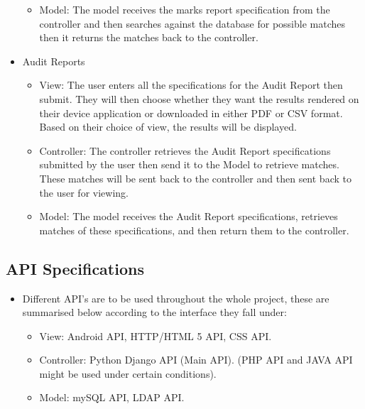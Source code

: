 \documentclass[12pt]{article}
\begin{document}
\begin{itemize}
\begin{itemize}
							\item Model: The model receives the marks report specification from the controller and then searches against the database for possible matches then it returns the matches back to the controller.
						\end{itemize}
					\item Audit Reports
						\begin{itemize}
							\item View: The user enters all the specifications for the Audit Report then submit. They will then choose whether they want the results rendered on their device application or downloaded in either PDF or CSV format. Based on their choice of view, the results will be displayed.
							\item Controller: The controller retrieves the Audit Report specifications submitted by the user then send it to the Model to retrieve matches. These matches will be sent back to the controller and then sent back to the user for viewing.
							\item Model: The model receives the Audit Report specifications, retrieves matches of these specifications, and then return them to the controller.
						\end{itemize}
				\end{itemize}
		\vspace{0.2in}
		
		\subsection{API Specifications}
						\begin{itemize}
				\item Different API's are to be used throughout the whole project, these are summarised below according to the interface they fall under: 
					\begin{itemize}
                                                \item View: Android API, HTTP/HTML 5 API, CSS API.
						\item Controller: Python Django API (Main API). (PHP API and JAVA API might be used under certain conditions).
						\item Model: mySQL API, LDAP API.
					\end{itemize}
			
		\end{itemize}
				\vspace{0.2in}
				
\end{document}

